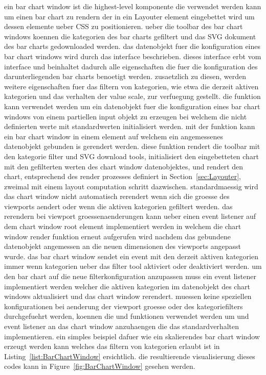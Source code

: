 ein bar chart window ist die highest-level komponente die verwendet werden kann um einen bar chart zu rendern der in ein Layouter element eingebettet wird um dessen elemente ueber CSS zu positionieren.
ueber die toolbar des bar chart windows koennen die kategorien des bar charts gefiltert und das SVG dokument des bar charts gedownloaded werden.
das datenobjekt fuer die konfiguration eines bar chart windows wird durch das  interface beschrieben.
dieses interface erbt vom  interface und beinhaltet dadurch alle eigenschaften die fuer die konfiguration des darunterliegenden bar charts benoetigt werden.
zusaetzlich zu diesen, werden weitere eigenschaften fuer das filtern von kategorien, wie etwa die derzeit aktiven kategorien und das verhalten der value scale, zur verfuegung gestellt.
die  funktion kann verwendet werden um ein datenobjekt fuer die konfiguration eines bar chart windows von einem partiellen input objekt zu erzeugen bei welchem die nicht definierten werte mit standardwerten initialisiert werden.
mit der  funktion kann ein bar chart window in einem  element auf welchem ein angemessenes datenobjekt gebunden is gerendert werden.
diese funktion rendert die toolbar mit den kategorie filter und SVG download tools, initialisiert den eingebetteten chart mit den gefilterten werten des chart window datenobjektes, und rendert den chart, entsprechend des render prozesses definiert in Section~\ref{sec:Layouter}, zweimal mit einem layout computation schritt dazwischen.
standardmaessig wird das chart window nicht automatisch rerendert wenn sich die groesse des viewports aendert oder wenn die aktiven kategorien gefiltert werden.
das rerendern bei viewport groessenaenderungen kann ueber einen  event listener auf dem chart window root element implementiert werden in welchem die chart window render funktion erneut aufgerufen wird nachdem das gebundene datenobjekt angemessen an die neuen dimensionen des viewports angepasst wurde.
das bar chart window sendet ein  event mit den derzeit aktiven kategorien immer wenn kategorien ueber das filter tool aktiviert oder deaktiviert werden.
um den bar chart auf die neue filterkonfiguration anzupassen muss ein  event listener implementiert werden welcher die aktiven kategorien im datenobjekt des chart windows aktualisiert und das chart window rerendert.
muessen keine speziellen konfigurationen bei aenderung der viewport groesse oder des kategoriefilters durchgefuehrt werden, koennen die  und  funktionen verwendet werden um  und  event listener an das chart window anzuhaengen die das standardverhalten implementieren.
ein simples beispiel dafuer wie ein skalierendes bar chart window erzeugt werden kann welches das filtern von kategorien erlaubt ist in Listing~\ref{list:BarChartWindow} ersichtlich.
die resultierende visualisierung dieses codes kann in Figure~\ref{fig:BarChartWindow} gesehen werden.

